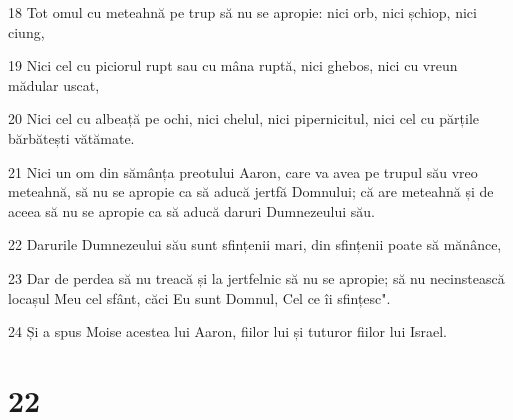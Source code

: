 \par 18 Tot omul cu meteahnă pe trup să nu se apropie: nici orb, nici șchiop, nici ciung,
\par 19 Nici cel cu piciorul rupt sau cu mâna ruptă, nici ghebos, nici cu vreun mădular uscat,
\par 20 Nici cel cu albeață pe ochi, nici chelul, nici pipernicitul, nici cel cu părțile bărbătești vătămate.
\par 21 Nici un om din sămânța preotului Aaron, care va avea pe trupul său vreo meteahnă, să nu se apropie ca să aducă jertfă Domnului; că are meteahnă și de aceea să nu se apropie ca să aducă daruri Dumnezeului său.
\par 22 Darurile Dumnezeului său sunt sfințenii mari, din sfințenii poate să mănânce,
\par 23 Dar de perdea să nu treacă și la jertfelnic să nu se apropie; să nu necinstească locașul Meu cel sfânt, căci Eu sunt Domnul, Cel ce îi sfințesc".
\par 24 Și a spus Moise acestea lui Aaron, fiilor lui și tuturor fiilor lui Israel.

\chapter{22}

